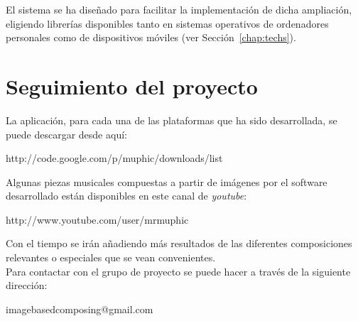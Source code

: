 \begin{itemize}
El sistema se ha diseñado para facilitar la implementación de dicha ampliación, eligiendo librerías disponibles tanto en sistemas operativos de ordenadores personales como de dispositivos móviles (ver Sección~\ref{chap:techs}).\\

\end{itemize}


\section{Seguimiento del proyecto}

La aplicación, para cada una de las plataformas que ha sido desarrollada, se puede descargar desde aquí:

\begin{center}
http://code.google.com/p/muphic/downloads/list
\end{center}

Algunas piezas musicales compuestas a partir de imágenes por el software desarrollado están disponibles en este canal de \emph{youtube}:

\begin{center}
http://www.youtube.com/user/mrmuphic
\end{center}

Con el tiempo se irán añadiendo más resultados de las diferentes composiciones relevantes o especiales que se vean convenientes.\\

Para contactar con el grupo de proyecto se puede hacer a través de la siguiente dirección:

\begin{center}
	imagebasedcomposing@gmail.com
\end{center}
